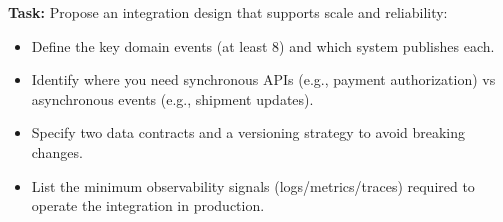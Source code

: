 \textbf{Task:} Propose an integration design that supports scale and reliability:
\begin{itemize}
  \item Define the key domain events (at least 8) and which system publishes each.
  \item Identify where you need synchronous APIs (e.g., payment authorization) vs asynchronous events (e.g., shipment updates).
  \item Specify two data contracts and a versioning strategy to avoid breaking changes.
  \item List the minimum observability signals (logs/metrics/traces) required to operate the integration in production.
\end{itemize}
